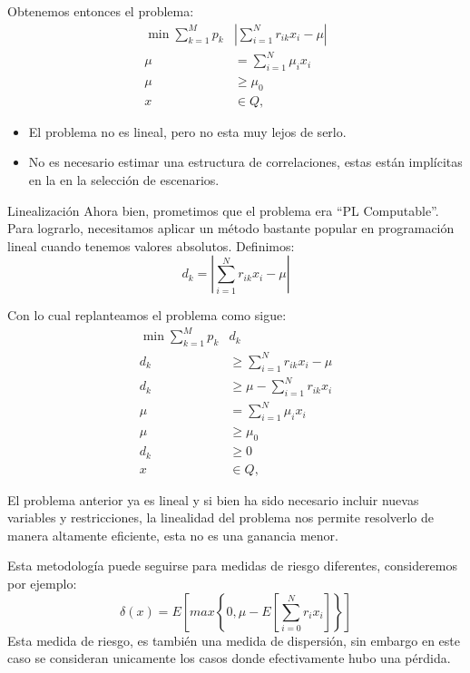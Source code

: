 \documentclass{beamer}
\begin{document}
    \begin{frame}
        Obtenemos entonces el problema:
        \begin{align*}
            \min \sum_{k=1}^M p_k&\left\vert\sum_{i=1}^{N} r_{ik}x_i-\mu\right\vert \\
            \mu &= \sum_{i=1}^N\mu_i x_i\\
            \mu&\geq \mu_0\\
            x& \in Q,
        \end{align*}
        \begin{block}{}
            \begin{itemize}
                \item El problema no es lineal, pero no esta muy lejos de serlo. 
                \item No es necesario estimar una estructura de correlaciones, estas están implícitas en la en la selección de escenarios. 
            \end{itemize}
        \end{block}
    \end{frame}
    \begin{frame}{Linealización}
        Ahora bien, prometimos que el problema era ``PL Computable''. Para lograrlo, necesitamos aplicar un método bastante popular en programación lineal cuando tenemos valores absolutos. Definimos:
        $$
        d_k = \left\vert\sum_{i=1}^{N} r_{ik}x_i-\mu\right\vert
        $$
    \end{frame}
    \begin{frame}
        Con lo cual replanteamos el problema como sigue:
    \begin{align*}
        \min \sum_{k=1}^M p_k&d_k \\
        d_k & \geq \sum_{i=1}^{N} r_{ik}x_i-\mu\\
        d_k & \geq \mu-\sum_{i=1}^{N} r_{ik}x_i\\
        \mu &= \sum_{i=1}^N\mu_i x_i\\
        \mu&\geq \mu_0\\
        d_k& \geq 0\\
        x& \in Q,
    \end{align*}
    \end{frame}
    \begin{frame}
        El problema anterior ya es lineal y si bien ha sido necesario incluir nuevas variables  y restricciones, la linealidad del problema nos permite resolverlo de manera altamente eficiente, esta no es una ganancia menor. 
        \par\medskip
        Esta metodología puede seguirse para medidas de riesgo diferentes, consideremos por ejemplo:
        $$
        \delta(x) = E\left[max\left\{0, \mu-E\left[\sum_{i=0}^N r_ix_i\right]\right\}\right]
        $$
        Esta medida de riesgo, es también una medida de dispersión, sin embargo en este caso se consideran unicamente los casos donde efectivamente hubo una pérdida.
    \end{frame}
\end{document}
